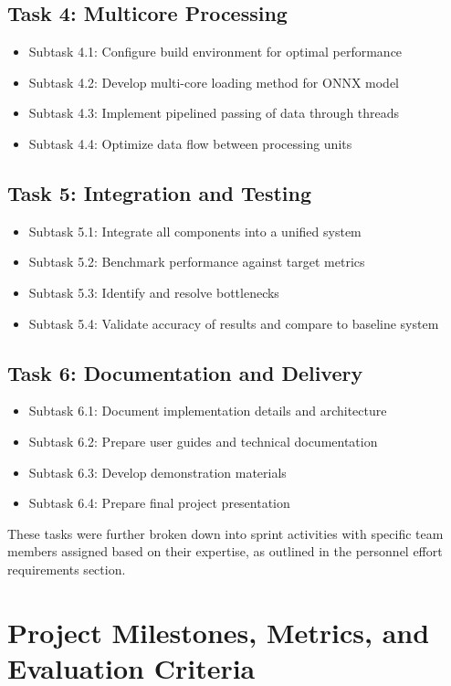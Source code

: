 \subsection{Task 4: Multicore Processing}
\begin{itemize}
\item Subtask 4.1: Configure build environment for optimal performance
\item Subtask 4.2: Develop multi-core loading method for ONNX model
\item Subtask 4.3: Implement pipelined passing of data through threads
\item Subtask 4.4: Optimize data flow between processing units
\end{itemize}

\subsection{Task 5: Integration and Testing}
\begin{itemize}
\item Subtask 5.1: Integrate all components into a unified system
\item Subtask 5.2: Benchmark performance against target metrics
\item Subtask 5.3: Identify and resolve bottlenecks
\item Subtask 5.4: Validate accuracy of results and compare to baseline system
\end{itemize}

\subsection{Task 6: Documentation and Delivery}
\begin{itemize}
\item Subtask 6.1: Document implementation details and architecture
\item Subtask 6.2: Prepare user guides and technical documentation
\item Subtask 6.3: Develop demonstration materials
\item Subtask 6.4: Prepare final project presentation
\end{itemize}

These tasks were further broken down into sprint activities with specific team members assigned based on their expertise, as outlined in the personnel effort requirements section.

\section{Project Milestones, Metrics, and Evaluation Criteria}\label{sec:milestones}


